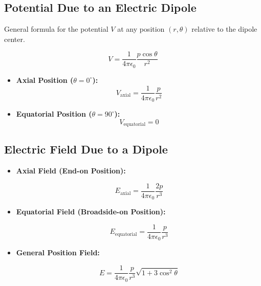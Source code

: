 \documentclass[11pt,a4paper]{article}
\begin{document}
\subsection{Potential Due to an Electric Dipole}
\begin{pyqbox}
    General formula for the potential $V$ at any position $(r, \theta)$ relative to the dipole center.
\end{pyqbox}

\begin{formulabox}
    \[ V = \frac{1}{4\pi\epsilon_0} \frac{p \cos\theta}{r^2} \]
\end{formulabox}

\begin{itemize}
    \item \textbf{Axial Position ($\theta = 0^\circ$):}
    \[ V_{\text{axial}} = \frac{1}{4\pi\epsilon_0} \frac{p}{r^2} \]
    \item \textbf{Equatorial Position ($\theta = 90^\circ$):}
    \[ V_{\text{equatorial}} = 0 \]
\end{itemize}

\subsection{Electric Field Due to a Dipole}

\begin{itemize}
    \item \textbf{Axial Field (End-on Position):}
    \begin{formulabox}
        \[ E_{\text{axial}} = \frac{1}{4\pi\epsilon_0} \frac{2p}{r^3} \]
    \end{formulabox}
    \item \textbf{Equatorial Field (Broadside-on Position):}
    \begin{formulabox}
        \[ E_{\text{equatorial}} = \frac{1}{4\pi\epsilon_0} \frac{p}{r^3} \]
    \end{formulabox}
    \item \textbf{General Position Field:}
    \begin{formulabox}
        \[ E = \frac{1}{4\pi\epsilon_0} \frac{p}{r^3} \sqrt{1 + 3\cos^2\theta} \]
    \end{formulabox}
\end{itemize}
\end{document}
